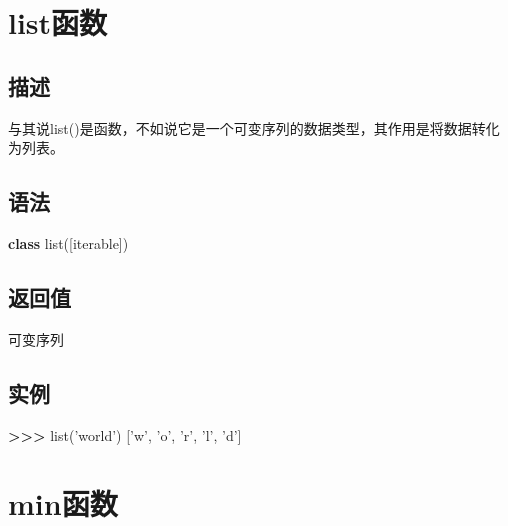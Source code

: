 \documentclass[]{ctexbook}
\newenvironment{Shaded}{\begin{snugshade}}{\end{snugshade}}
\newcommand{\BuiltInTok}[1]{#1}
\newcommand{\KeywordTok}[1]{\textcolor[rgb]{0.13,0.29,0.53}{\textbf{#1}}}
\newcommand{\NormalTok}[1]{#1}
\newcommand{\OperatorTok}[1]{\textcolor[rgb]{0.81,0.36,0.00}{\textbf{#1}}}
\newcommand{\StringTok}[1]{\textcolor[rgb]{0.31,0.60,0.02}{#1}}
\begin{document}
\hypertarget{listux51fdux6570}{%
\section{list函数}\label{listux51fdux6570}}

\hypertarget{ux63cfux8ff0-2}{%
\subsection{描述}\label{ux63cfux8ff0-2}}

与其说list()是函数，不如说它是一个可变序列的数据类型，其作用是将数据转化为列表。

\hypertarget{ux8bedux6cd5-2}{%
\subsection{语法}\label{ux8bedux6cd5-2}}

\begin{Shaded}
\begin{Highlighting}[]
\KeywordTok{class} \BuiltInTok{list}\NormalTok{([iterable])}
\end{Highlighting}
\end{Shaded}

\hypertarget{ux8fd4ux56deux503c-2}{%
\subsection{返回值}\label{ux8fd4ux56deux503c-2}}

可变序列

\hypertarget{ux5b9eux4f8b-2}{%
\subsection{实例}\label{ux5b9eux4f8b-2}}

\begin{Shaded}
\begin{Highlighting}[]
\OperatorTok{>>>} \BuiltInTok{list}\NormalTok{(}\StringTok{'world'}\NormalTok{)}
\NormalTok{[}\StringTok{'w'}\NormalTok{, }\StringTok{'o'}\NormalTok{, }\StringTok{'r'}\NormalTok{, }\StringTok{'l'}\NormalTok{, }\StringTok{'d'}\NormalTok{]}
\end{Highlighting}
\end{Shaded}

\hypertarget{minux51fdux6570}{%
\section{min函数}\label{minux51fdux6570}}
\end{document}
